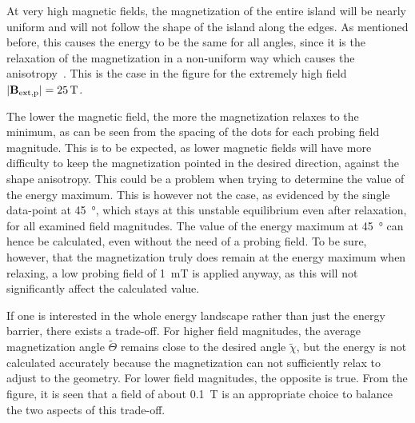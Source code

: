 \documentclass[11pt,a4paper,english,twoside]{article}
\begin{document}
At very high magnetic fields, the magnetization of the entire island will be nearly uniform and will not follow the shape of the island along the edges. As mentioned before, this causes the energy to be the same for all angles, since it is the relaxation of the magnetization in a non-uniform way which causes the anisotropy~\cite{Nonmonotonic_reversal}. This is the case in the figure for the extremely high field $\abs{\vb{B_\mathrm{ext,p}}}=\SI{25}{\tesla}$. \par
The lower the magnetic field, the more the magnetization relaxes to the minimum, as can be seen from the spacing of the dots for each probing field magnitude. This is to be expected, as lower magnetic fields will have more difficulty to keep the magnetization pointed in the desired direction, against the shape anisotropy. This could be a problem when trying to determine the value of the energy maximum. This is however not the case, as evidenced by the single data-point at \SI{45}{\degree}, which stays at this unstable equilibrium even after relaxation, for all examined field magnitudes. The value of the energy maximum at \SI{45}{\degree} can hence be calculated, even without the need of a probing field. To be sure, however, that the magnetization truly does remain at the energy maximum when relaxing, a low probing field of \SI{1}{\milli\tesla} is applied anyway, as this will not significantly affect the calculated value. \par
If one is interested in the whole energy landscape rather than just the energy barrier, there exists a trade-off. For higher field magnitudes, the average magnetization angle $\widetilde{\Theta}$ remains close to the desired angle $\widetilde{\chi}$, but the energy is not calculated accurately because the magnetization can not sufficiently relax to adjust to the geometry. For lower field magnitudes, the opposite is true. From the figure, it is seen that a field of about \SI{0.1}{\tesla} is an appropriate choice to balance the two aspects of this trade-off. \par
\end{document}
